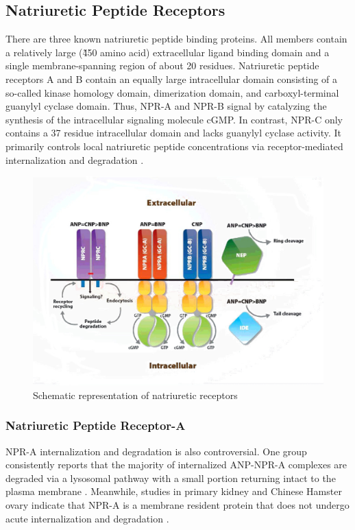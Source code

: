\documentclass[14pt,a4paper,onecolumn]{extarticle}
\begin{document}
\subsection{Natriuretic Peptide Receptors}
There are three known natriuretic peptide binding proteins. All members contain a relatively large (\~450 amino acid) extracellular ligand binding domain and a single membrane-spanning region of about 20 residues. Natriuretic peptide receptors A and B contain an equally large intracellular domain consisting of a so-called kinase homology domain, dimerization domain, and carboxyl-terminal guanylyl cyclase domain. Thus, NPR-A and NPR-B signal by catalyzing the synthesis of the intracellular signaling molecule cGMP. In contrast, NPR-C only contains a 37 residue intracellular domain and lacks guanylyl cyclase activity. It primarily controls local natriuretic peptide concentrations via receptor-mediated internalization and degradation \citep{Rose2008}.

\begin{figure}
    \centering
    \includegraphics[scale=1]{../../images/NP_receptors.jpg}
    \small\caption{Schematic representation of natriuretic receptors}
    \label{NP_receptors}
\end{figure}


\subsubsection{Natriuretic Peptide Receptor-A}

NPR-A internalization and degradation is also controversial. One group consistently reports that the majority of internalized ANP-NPR-A complexes are degraded via a lysosomal pathway with a small portion returning intact to the plasma membrane \citep{Pandey2002}. Meanwhile, studies in primary kidney and Chinese Hamster ovary indicate that NPR-A is a membrane resident protein that does not undergo acute internalization and degradation \citep{Fan2005} \citep{Vieira2001}.
\end{document}
